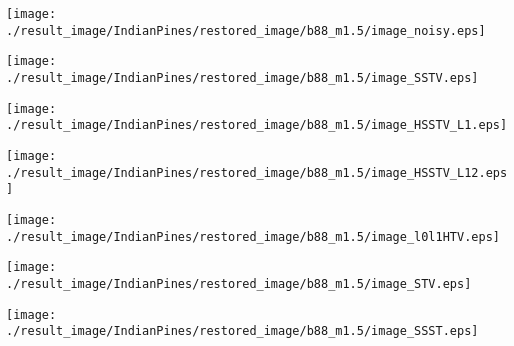 \begin{figure*}[t]
    \begin{center}
        \begin{minipage}{0.125\hsize}
            \centerline{\texttt{[image: ./result\_image/IndianPines/restored\_image/b88\_m1.5/image\_noisy.eps]}} %
        \end{minipage}
        \begin{minipage}{0.125\hsize}
            \centerline{\texttt{[image: ./result\_image/IndianPines/restored\_image/b88\_m1.5/image\_SSTV.eps]}} %
        \end{minipage}
        \begin{minipage}{0.125\hsize}
            \centerline{\texttt{[image: ./result\_image/IndianPines/restored\_image/b88\_m1.5/image\_HSSTV\_L1.eps]}} %
        \end{minipage}
        \begin{minipage}{0.125\hsize}
            \centerline{\texttt{[image: ./result\_image/IndianPines/restored\_image/b88\_m1.5/image\_HSSTV\_L12.eps]}} %
        \end{minipage}
        \begin{minipage}{0.125\hsize}
            \centerline{\texttt{[image: ./result\_image/IndianPines/restored\_image/b88\_m1.5/image\_l0l1HTV.eps]}} %
        \end{minipage}
        \begin{minipage}{0.125\hsize}
        	\centerline{\texttt{[image: ./result\_image/IndianPines/restored\_image/b88\_m1.5/image\_STV.eps]}} %
        \end{minipage}
        \begin{minipage}{0.125\hsize}
            \centerline{\texttt{[image: ./result\_image/IndianPines/restored\_image/b88\_m1.5/image\_SSST.eps]}} %
        \end{minipage}

        \vspace{1mm}


\end{center}
\end{figure*}
